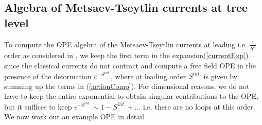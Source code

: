 \documentclass[12pt]{article}
\numberwithin{equation}{section}
\begin{document}
\subsection{Algebra of Metsaev-Tseytlin currents at tree level}
\label{fourfive}
To compute the OPE algebra of the Metsaev-Tseytlin currents at leading i.e. $\frac{1}{R^2}$ order as considered in \cite{Bianchi:2006im, Puletti:2006vb, Mikhailov:2007mr}, we keep the first term in the expansion(\ref{currentExp}) since the classical currents do not contract and compute a free field OPE in the presence of the deformation $e^{-S^{int.}}$, where at leading order $S^{int.}$ is given by summing up the terms in (\ref{actionComp}). For dimensional reasons, we do not have to keep the entire exponential to obtain singular contributions to the OPE, but it suffices to keep $e^{-S^{int.}} \sim 1 - S^{int.} + \ldots$ i.e. there are no loops at this order. We now work out an example OPE in detail
\end{document}
